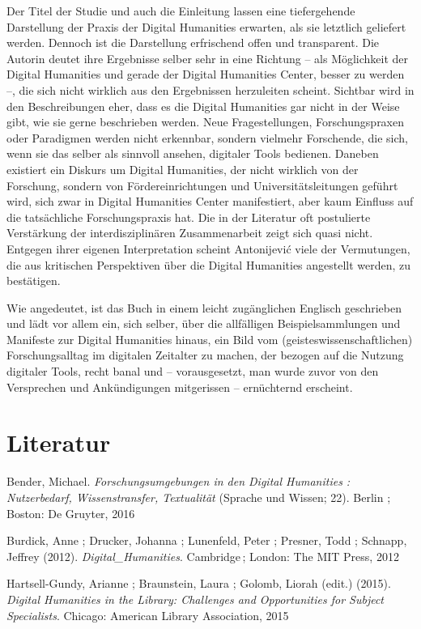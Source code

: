 \documentclass[a4paper,
fontsize=11pt,
oneside,
numbers=noperiodatend,
parskip=half-,
bibliography=totoc,
final
]{scrartcl}
\begin{document}
Der Titel der Studie und auch die Einleitung lassen eine tiefergehende
Darstellung der Praxis der Digital Humanities erwarten, als sie
letztlich geliefert werden. Dennoch ist die Darstellung erfrischend
offen und transparent. Die Autorin deutet ihre Ergebnisse selber sehr in
eine Richtung -- als Möglichkeit der Digital Humanities und gerade der
Digital Humanities Center, besser zu werden --, die sich nicht wirklich
aus den Ergebnissen herzuleiten scheint. Sichtbar wird in den
Beschreibungen eher, dass es die Digital Humanities gar nicht in der
Weise gibt, wie sie gerne beschrieben werden. Neue Fragestellungen,
Forschungspraxen oder Paradigmen werden nicht erkennbar, sondern
vielmehr Forschende, die sich, wenn sie das selber als sinnvoll ansehen,
digitaler Tools bedienen. Daneben existiert ein Diskurs um Digital
Humanities, der nicht wirklich von der Forschung, sondern von
Fördereinrichtungen und Universitätsleitungen geführt wird, sich zwar in
Digital Humanities Center manifestiert, aber kaum Einfluss auf die
tatsächliche Forschungspraxis hat. Die in der Literatur oft postulierte
Verstärkung der interdisziplinären Zusammenarbeit zeigt sich quasi
nicht. Entgegen ihrer eigenen Interpretation scheint Antonijević viele
der Vermutungen, die aus kritischen Perspektiven über die Digital
Humanities angestellt werden, zu bestätigen.

Wie angedeutet, ist das Buch in einem leicht zugänglichen Englisch
geschrieben und lädt vor allem ein, sich selber, über die allfälligen
Beispielsammlungen und Manifeste zur Digital Humanities hinaus, ein Bild
vom (geisteswissenschaftlichen) Forschungsalltag im digitalen Zeitalter
zu machen, der bezogen auf die Nutzung digitaler Tools, recht banal und
-- vorausgesetzt, man wurde zuvor von den Versprechen und Ankündigungen
mitgerissen -- ernüchternd erscheint.

\section*{Literatur}\label{literatur}

Bender, Michael. \emph{Forschungsumgebungen in den Digital Humanities :
Nutzerbedarf, Wissenstransfer, Textualität} (Sprache und Wissen; 22).
Berlin ; Boston: De Gruyter, 2016

Burdick, Anne ; Drucker, Johanna ; Lunenfeld, Peter ; Presner, Todd ;
Schnapp, Jeffrey (2012). \emph{Digital\_Humanities}. Cambridge\,;
London: The MIT Press, 2012

Hartsell-Gundy, Arianne ; Braunstein, Laura ; Golomb, Liorah (edit.)
(2015). \emph{Digital Humanities in the Library: Challenges and
Opportunities for Subject Specialists}. Chicago: American Library
Association, 2015
\end{document}
